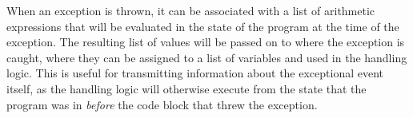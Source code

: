 When an exception is thrown, it can be associated with a list of arithmetic expressions that will be evaluated in the state of the program at the time of the exception. The resulting list of values will be passed on to where the exception is caught, where they can be assigned to a list of variables and used in the handling logic. This is useful for transmitting information about the exceptional event itself, as the handling logic will otherwise execute from the state that the program was in \emph{before} the code block that threw the exception.